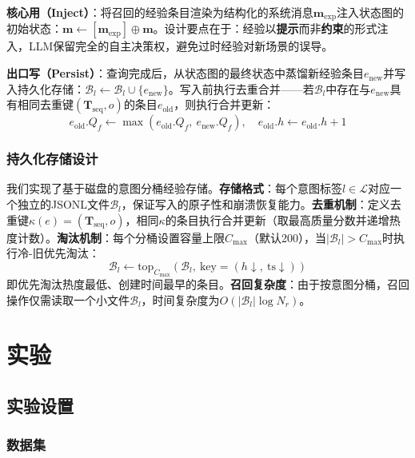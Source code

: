 \documentclass[runningheads]{llncs}
\begin{document}
\textbf{核心用（Inject）}：将召回的经验条目渲染为结构化的系统消息$\mathbf{m}_{\text{exp}}$注入状态图的初始状态：$\mathbf{m} \leftarrow [\mathbf{m}_{\text{exp}}] \oplus \mathbf{m}$。设计要点在于：经验以\textbf{提示}而非\textbf{约束}的形式注入，LLM保留完全的自主决策权，避免过时经验对新场景的误导。

\textbf{出口写（Persist）}：查询完成后，从状态图的最终状态中蒸馏新经验条目$e_{\text{new}}$并写入持久化存储：$\mathcal{B}_l \leftarrow \mathcal{B}_l \cup \{e_{\text{new}}\}$。写入前执行去重合并——若$\mathcal{B}_l$中存在与$e_{\text{new}}$具有相同去重键$(\mathbf{T}_{\text{seq}}, o)$的条目$e_{\text{old}}$，则执行合并更新：
\begin{equation}
    e_{\text{old}}.Q_f \leftarrow \max(e_{\text{old}}.Q_f,\ e_{\text{new}}.Q_f), \quad e_{\text{old}}.h \leftarrow e_{\text{old}}.h + 1
\end{equation}

\subsubsection{持久化存储设计}

我们实现了基于磁盘的意图分桶经验存储。\textbf{存储格式}：每个意图标签$l \in \mathcal{L}$对应一个独立的JSONL文件$\mathcal{B}_l$，保证写入的原子性和崩溃恢复能力。\textbf{去重机制}：定义去重键$\kappa(e) = (\mathbf{T}_{\text{seq}}, o)$，相同$\kappa$的条目执行合并更新（取最高质量分数并递增热度计数）。\textbf{淘汰机制}：每个分桶设置容量上限$C_{\max}$（默认200），当$|\mathcal{B}_l| > C_{\max}$时执行冷-旧优先淘汰：
\begin{equation}
    \mathcal{B}_l \leftarrow \text{top}_{C_{\max}}\!\left(\mathcal{B}_l,\ \text{key} = (h \downarrow,\ \text{ts} \downarrow)\right)
\end{equation}
即优先淘汰热度最低、创建时间最早的条目。\textbf{召回复杂度}：由于按意图分桶，召回操作仅需读取一个小文件$\mathcal{B}_l$，时间复杂度为$O(|\mathcal{B}_l| \log N_r)$。

\section{实验}

\subsection{实验设置}

\subsubsection{数据集}
\end{document}

